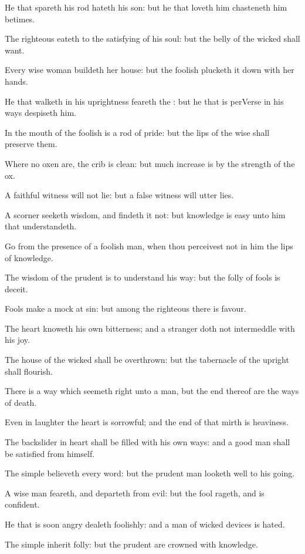 \Verse He that spareth his rod hateth his son: but he that loveth him chasteneth him betimes.

\Verse The righteous eateth to the satisfying of his soul: but the belly of the wicked shall want.


\Chapter
\Verse Every wise woman buildeth her house: but the foolish plucketh it down with her hands.

\Verse He that walketh in his uprightness feareth the \LORD: but he that is perVerse in his ways despiseth him.

\Verse In the mouth of the foolish is a rod of pride: but the lips of the wise shall preserve them.

\Verse Where no oxen are, the crib is clean: but much increase is by the strength of the ox.

\Verse A faithful witness will not lie: but a false witness will utter lies.

\Verse A scorner seeketh wisdom, and findeth it not: but knowledge is easy unto him that understandeth.

\Verse Go from the presence of a foolish man, when thou perceivest not in him the lips of knowledge.

\Verse The wisdom of the prudent is to understand his way: but the folly of fools is deceit.

\Verse Fools make a mock at sin: but among the righteous there is favour.

\Verse The heart knoweth his own bitterness; and a stranger doth not intermeddle with his joy.

\Verse The house of the wicked shall be overthrown: but the tabernacle of the upright shall flourish.

\Verse There is a way which seemeth right unto a man, but the end thereof are the ways of death.

\Verse Even in laughter the heart is sorrowful; and the end of that mirth is heaviness.

\Verse The backslider in heart shall be filled with his own ways: and a good man shall be satisfied from himself.

\Verse The simple believeth every word: but the prudent man looketh well to his going.

\Verse A wise man feareth, and departeth from evil: but the fool rageth, and is confident.

\Verse He that is soon angry dealeth foolishly: and a man of wicked devices is hated.

\Verse The simple inherit folly: but the prudent are crowned with knowledge.

